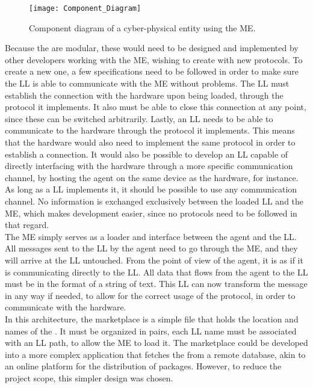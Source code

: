 \begin{figure}[h!]
	\centering
	\texttt{[image: Component\_Diagram]}
	\caption{Component diagram of a cyber-physical entity using the \acrlong{ME}.}
	\label{fig:component_diagram}
\end{figure}

Because the  are modular, these would need to be designed and implemented by other developers working with the \acrlong{ME}, wishing to create  with new protocols. To create a new one, a few specifications need to be followed in order to make sure the \acrshort{LL} is able to communicate with the \acrshort{ME} without problems. The \acrshort{LL} must establish the connection with the hardware upon being loaded, through the protocol it implements. It also must be able to close this connection at any point, since these  can be switched arbitrarily. Lastly, an \acrshort{LL} needs to be able to communicate to the hardware through the protocol it implements. This means that the hardware would also need to implement the same protocol in order to establish a connection. It would also be possible to develop an \acrshort{LL} capable of directly interfacing with the hardware through a more specific communication channel, by hosting the agent on the same device as the hardware, for instance. As long as a \acrlong{LL} implements it, it should be possible to use any communication channel. No information is exchanged exclusively between the loaded \acrlong{LL} and the \acrlong{ME}, which makes development easier, since no protocols need to be followed in that regard.\\ 

The \acrlong{ME} simply serves as a loader and interface between the agent and the \acrlong{LL}. All messages sent to the \acrshort{LL} by the agent need to go through the \acrshort{ME}, and they will arrive at the \acrshort{LL} untouched. From the point of view of the agent, it is as if it is communicating directly to the \acrshort{LL}. All data that flows from the agent to the \acrlong{LL} must be in the format of a string of text. This \acrshort{LL} can now transform the message in any way if needed, to allow for the correct usage of the protocol, in order to communicate with the hardware.\\

In this architecture, the marketplace is a simple file that holds the location and names of the . It must be organized in pairs, each \acrshort{LL} name must be associated with an \acrshort{LL} path, to allow the \acrshort{ME} to load it. The marketplace could be developed into a more complex application that fetches the  from a remote database, akin to an online platform for the distribution of packages. However, to reduce the project scope, this simpler design was chosen.

